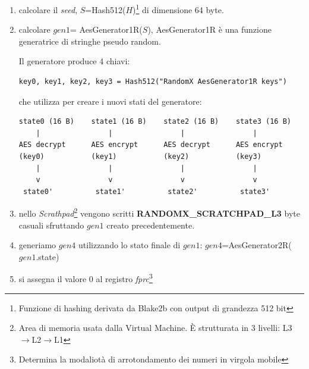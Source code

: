 \documentclass[12pt,a4paper]{article}
\begin{document}
\begin{enumerate}
        La chaive $k$ è utilizzata per inizializzare un
        BlakeGenerator\footnote{Pseudo random generator basato su Blake2b} che a
        sua volta permette di creare 8 \textit{SuperscalarHash}.
        \textit{SuperscalarHash} è una funzione di diffusione progettata per
        consumare quanta più energia possibile utilizzando soltanto le
        ALU\footnote{Arithemtic Logic Unit} della CPU. Questa funzione va a
        prendere in input 8 registri di dimensione 64 byte e restituisce il
        DataSet.

    \item calcolare il \textit{seed}, $S$=Hash512($H$)\footnote{Funzione di
        hashing derivata da Blake2b con output di grandezza 512 bit} di
        dimensione 64 byte.
    \item calcolare $gen1$= AesGenerator1R($S$), AesGenerator1R è una funzione
        generatrice di stringhe pseudo random. 

        Il generatore produce 4 chiavi:

        \begin{verbatim}
key0, key1, key2, key3 = Hash512("RandomX AesGenerator1R keys")
        \end{verbatim}
        
        che utilizza per creare i nuovi stati del generatore:

        \begin{verbatim}
state0 (16 B)    state1 (16 B)    state2 (16 B)    state3 (16 B)
    |                |                |                |
AES decrypt      AES encrypt      AES decrypt      AES encrypt
(key0)           (key1)           (key2)           (key3)
    |                |                |                |
    v                v                v                v
 state0'          state1'          state2'          state3'
        \end{verbatim}

    \item nello \textit{Scrathpad}\footnote{Area di memoria usata dalla Virtual
    Machine. È strutturata in 3 livelli: L3$\rightarrow$L2$\rightarrow$L1}
    vengono scritti \textbf{RANDOMX\_SCRATCHPAD\_L3} byte casuali sfruttando
    $gen1$ creato precedentemente.

    \item generiamo $gen4$ utilizzando lo stato finale di $gen1$:
    $gen4$=AesGenerator2R($gen1$.state)

    \item si assegna il valore 0 al registro \textit{fprc}\footnote{Determina la
    modaliotà di arrotondamento dei numeri in virgola mobile}


\end{enumerate}
\end{document}
